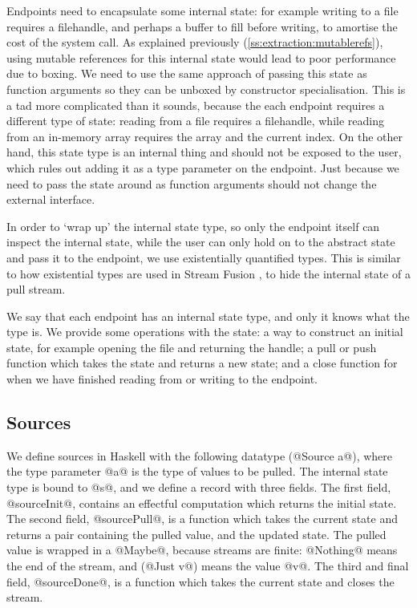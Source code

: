 Endpoints need to encapsulate some internal state: for example writing to a file requires a filehandle, and perhaps a buffer to fill before writing, to amortise the cost of the system call.
As explained previously (\autoref{ss:extraction:mutablerefs}), using mutable references for this internal state would lead to poor performance due to boxing.
We need to use the same approach of passing this state as function arguments so they can be unboxed by constructor specialisation.
This is a tad more complicated than it sounds, because the each endpoint requires a different type of state: reading from a file requires a filehandle, while reading from an in-memory array requires the array and the current index.
On the other hand, this state type is an internal thing and should not be exposed to the user, which rules out adding it as a type parameter on the endpoint.
Just because we need to pass the state around as function arguments should not change the external interface.

In order to `wrap up' the internal state type, so only the endpoint itself can inspect the internal state, while the user can only hold on to the abstract state and pass it to the endpoint, we use existentially quantified types.
This is similar to how existential types are used in Stream Fusion \cite{coutts2007stream}, to hide the internal state of a pull stream.

We say that each endpoint has an internal state type, and only it knows what the type is.
We provide some operations with the state: a way to construct an initial state, for example opening the file and returning the handle; a pull or push function which takes the state and returns a new state; and a close function for when we have finished reading from or writing to the endpoint.

\subsection{Sources}

We define sources in Haskell with the following datatype (@Source a@), where the type parameter @a@ is the type of values to be pulled.
The internal state type is bound to @s@, and we define a record with three fields.
The first field, @sourceInit@, contains an effectful computation which returns the initial state.
The second field, @sourcePull@, is a function which takes the current state and returns a pair containing the pulled value, and the updated state.
The pulled value is wrapped in a @Maybe@, because streams are finite: @Nothing@ means the end of the stream, and (@Just v@) means the value @v@.
The third and final field, @sourceDone@, is a function which takes the current state and closes the stream.

